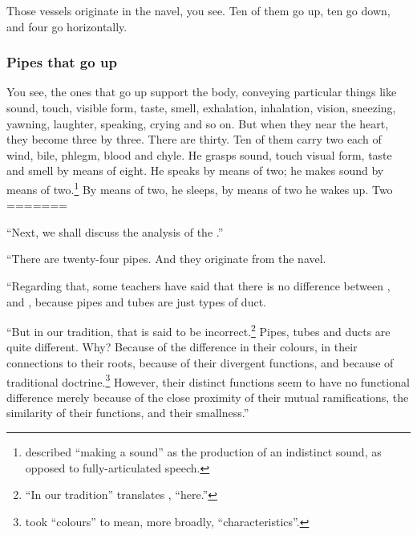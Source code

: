 \begin{refsection}
\begin{translation}
    \item[4]

    Those vessels originate in the navel, you see.  Ten of them go up, ten
    go down, and four go horizontally.

\subsubsection{Pipes that go up}
    \item[5]

    You see, the ones that go up support the body, conveying particular
    things like sound, touch, visible form, taste, smell, exhalation,
    inhalation, vision, sneezing, yawning, laughter, speaking, crying and
    so on.  But when they near the heart, they become three by three.
    There are thirty.  Ten of them carry two each of wind, bile, phlegm,
    blood and chyle. He grasps sound, touch visual form, taste and smell
    by means of eight. He speaks by means of two; he makes sound by means
    of two.\footnote{ described “making a sound” as
        the production of an indistinct sound, as opposed to fully-articulated
        speech.}  By means of two, he sleeps, by means of two he wakes up. Two
=======
\item [1]

“Next, we shall discuss the analysis  of the .”

\item[3]

“There are twenty-four pipes.  And they originate from the navel.

“Regarding that, some teachers have said that there is no difference
between ,  and
, because pipes and tubes are just types of duct.
    
“But in our tradition, that is said to be incorrect.\footnote{“In our
    tradition” translates , “here.”} Pipes, tubes  and ducts are
    quite different. Why? Because of the difference in their colours, in
    their connections to their roots, because of their divergent
    functions, and because of traditional
    doctrine.\footnote{ took  “colours”
        to mean, more broadly, “characteristics”.} However, their distinct
        functions seem to have no functional difference merely because of the
        close proximity of their mutual ramifications, the similarity of their
        functions, and their smallness.”


\end{translation}
\end{refsection}
